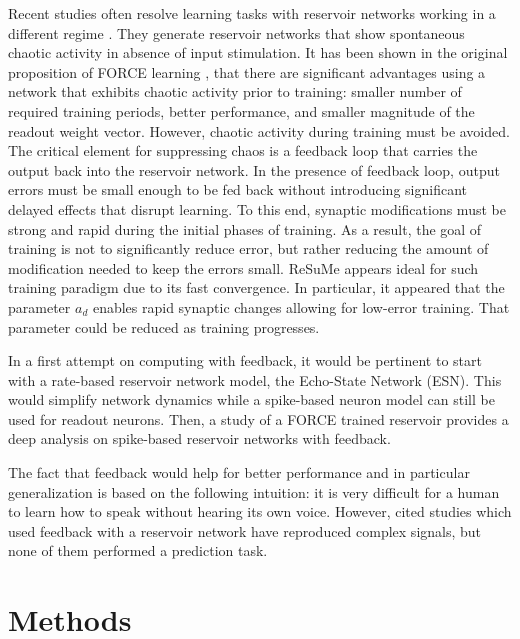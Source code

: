 \documentclass[11pt, a4paper]{article} %
\begin{document}
Recent studies often resolve learning tasks with reservoir networks working in a different regime \cite{jaeger2004harnessing, sussillo2009generating, nicola2016supervised}. They generate reservoir networks that show spontaneous chaotic activity in absence of input stimulation. It has been shown in the original proposition of FORCE learning \cite{sussillo2009generating}, that there are significant advantages using a network that exhibits chaotic activity prior to training: smaller number of required training periods, better performance, and smaller magnitude of the readout weight vector. However, chaotic activity during training must be avoided. The critical element for suppressing chaos is a feedback loop that carries the output back into the reservoir network. In the presence of feedback loop, output errors must be small enough to be fed back without introducing significant delayed effects that disrupt learning. To this end, synaptic modifications must be strong and rapid during the initial phases of training. As a result, the goal of training is not to significantly reduce error, but rather reducing the amount of modification needed to keep the errors small. ReSuMe appears ideal for such training paradigm due to its fast convergence. In particular, it appeared that the parameter $a_d$ enables rapid synaptic changes allowing for low-error training. That parameter could be reduced as training progresses.

In a first attempt on computing with feedback, it would be pertinent to start with a rate-based reservoir network model, the Echo-State Network (ESN). This would simplify network dynamics while a spike-based neuron model can still be used for readout neurons. Then, a study of a FORCE trained reservoir \cite{nicola2016supervised} provides a deep analysis on spike-based reservoir networks with feedback.

The fact that feedback would help for better performance and in particular generalization is based on the following intuition: it is very difficult for a human to learn how to speak without hearing its own voice. However, cited studies which used feedback with a reservoir network have reproduced complex signals, but none of them performed a prediction task.

\section{Methods \label{methods}}
\end{document}
